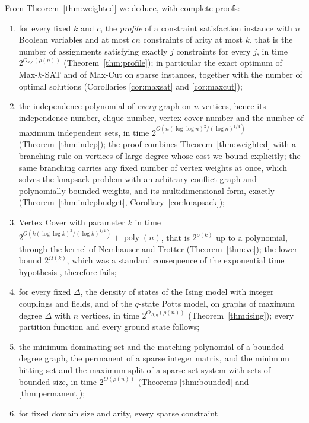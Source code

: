 \documentclass[11pt,reqno]{amsart}
\numberwithin{equation}{section}
\theoremstyle{plain}
\theoremstyle{definition}
\theoremstyle{remark}
\DeclareMathOperator{\poly}{poly}
\newcommand{\rhon}{\rho}
\begin{document}
From Theorem~\ref{thm:weighted} we deduce, with complete proofs:
\begin{enumerate}[label=(\roman*),leftmargin=2.2em]
\item\label{it:profile} for every fixed $k$ and $c$, the \emph{profile} of a
constraint satisfaction instance with $n$ Boolean variables and at most $cn$
constraints of arity at most $k$, that is the number of assignments satisfying
exactly $j$ constraints for every $j$, in time $2^{O_{k,c}(\rhon(n))}$
(Theorem~\ref{thm:profile}); in particular the exact optimum of Max-$k$-SAT and
of Max-Cut on sparse instances, together with the number of optimal solutions
(Corollaries \ref{cor:maxsat} and \ref{cor:maxcut});
\item\label{it:indep} the independence polynomial of \emph{every} graph on $n$
vertices, hence its independence number, clique number, vertex cover number and the
number of maximum independent sets, in time
$2^{O(n(\log\log n)^2/(\log n)^{1/4})}$ (Theorem~\ref{thm:indep}); the proof
combines Theorem~\ref{thm:weighted} with a branching rule on vertices of large
degree whose cost we bound explicitly; the same branching carries any fixed
number of vertex weights at once, which solves the knapsack problem with an
arbitrary conflict graph and polynomially bounded weights, and its
multidimensional form, exactly (Theorem~\ref{thm:indepbudget},
Corollary~\ref{cor:knapsack});
\item\label{it:vc} Vertex Cover with parameter $k$ in time
$2^{O(k(\log\log k)^2/(\log k)^{1/4})}+\poly(n)$, that is $2^{o(k)}$ up to a
polynomial, through the kernel of Nemhauser and Trotter (Theorem~\ref{thm:vc});
the lower bound $2^{\Omega(k)}$, which was a standard consequence of the
exponential time hypothesis \cite[Theorem 14.6]{CFKLMPPS15}, therefore fails;
\item\label{it:ising} for every fixed $\Delta$, the density of states of the
Ising model with integer couplings and fields, and of the $q$-state Potts model,
on graphs of maximum degree $\Delta$ with $n$ vertices, in time
$2^{O_{\Delta,q}(\rhon(n))}$ (Theorem~\ref{thm:ising}); every partition function
and every ground state follows;
\item\label{it:bounded} the minimum dominating set and the matching polynomial of
a bounded-degree graph, the permanent of a sparse integer matrix, and the
minimum hitting set and the maximum split of a sparse set system with sets of
bounded size, in time $2^{O(\rhon(n))}$ (Theorems \ref{thm:bounded} and
\ref{thm:permanent});
\item\label{it:domain} for fixed domain size and arity, every sparse constraint

\end{enumerate}
\end{document}
